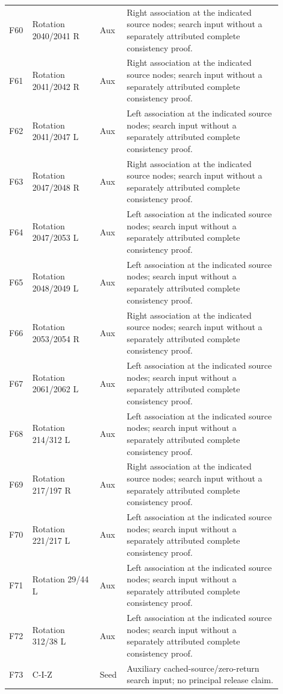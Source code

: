 \begin{longtable}{@{}p{0.055\linewidth}p{0.235\linewidth}p{0.08\linewidth}p{0.535\linewidth}@{}}
F60 & Rotation 2040/2041 R & Aux & Right association at the indicated source nodes; search input without a separately attributed complete consistency proof. \\
F61 & Rotation 2041/2042 R & Aux & Right association at the indicated source nodes; search input without a separately attributed complete consistency proof. \\
F62 & Rotation 2041/2047 L & Aux & Left association at the indicated source nodes; search input without a separately attributed complete consistency proof. \\
F63 & Rotation 2047/2048 R & Aux & Right association at the indicated source nodes; search input without a separately attributed complete consistency proof. \\
F64 & Rotation 2047/2053 L & Aux & Left association at the indicated source nodes; search input without a separately attributed complete consistency proof. \\
F65 & Rotation 2048/2049 L & Aux & Left association at the indicated source nodes; search input without a separately attributed complete consistency proof. \\
F66 & Rotation 2053/2054 R & Aux & Right association at the indicated source nodes; search input without a separately attributed complete consistency proof. \\
F67 & Rotation 2061/2062 L & Aux & Left association at the indicated source nodes; search input without a separately attributed complete consistency proof. \\
F68 & Rotation 214/312 L & Aux & Left association at the indicated source nodes; search input without a separately attributed complete consistency proof. \\
F69 & Rotation 217/197 R & Aux & Right association at the indicated source nodes; search input without a separately attributed complete consistency proof. \\
F70 & Rotation 221/217 L & Aux & Left association at the indicated source nodes; search input without a separately attributed complete consistency proof. \\
F71 & Rotation 29/44 L & Aux & Left association at the indicated source nodes; search input without a separately attributed complete consistency proof. \\
F72 & Rotation 312/38 L & Aux & Left association at the indicated source nodes; search input without a separately attributed complete consistency proof. \\
F73 & C-I-Z & Seed & Auxiliary cached-source/zero-return search input; no principal release claim. \\

\end{longtable}
